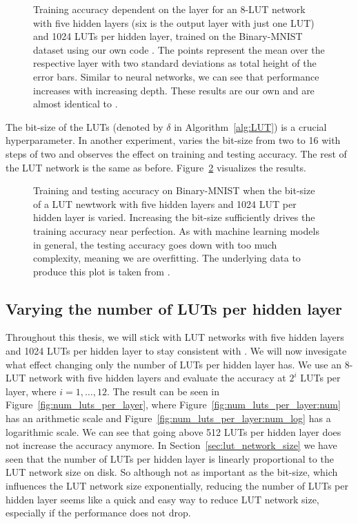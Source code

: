 \begin{figure}[!htb]
    \centering
    
    \caption{Training accuracy dependent on the layer for an 8-LUT network with five hidden layers (six is the output layer with just one LUT) and 1024 LUTs per hidden layer, trained on the Binary-MNIST dataset using our own code \cite{bib:lut_github}. The points represent the mean over the respective layer with two standard deviations as total height of the error bars. Similar to neural networks, we can see that performance increases with increasing depth. These results are our own and are almost identical to \cite{bib:chatterjee2018learning}.}
\label{fig:ex1_depth_performance}
\end{figure}
\FloatBarrier

\noindent The bit-size of the LUTs (denoted by $\delta$ in Algorithm~\ref{alg:LUT}) is a crucial hyperparameter. In another experiment, \cite{bib:chatterjee2018learning} varies the bit-size from two to 16 with steps of two and observes the effect on training and testing accuracy. The rest of the LUT network is the same as before. Figure~\ref{fig:ex1_k_acc} visualizes the results.

\begin{figure}[!htb]
    \centering
    
    \caption{Training and testing accuracy on Binary-MNIST when the bit-size of a LUT newtwork with five hidden layers and 1024 LUT per hidden layer is varied. Increasing the bit-size sufficiently drives the training accuracy near perfection. As with machine learning models in general, the testing accuracy goes down with too much complexity, meaning we are overfitting. The underlying data to produce this plot is taken from \cite{bib:chatterjee2018learning}.}
\label{fig:ex1_k_acc}
\end{figure}
\FloatBarrier

\subsection{Varying the number of LUTs per hidden layer} \label{sec:num_luts_per_layer}
Throughout this thesis, we will stick with LUT networks with five hidden layers and 1024 LUTs per hidden layer to stay consistent with \cite{bib:chatterjee2018learning}. We will now invesigate what effect changing only the number of LUTs per hidden layer has. We use an 8-LUT network with five hidden layers and evaluate the accuracy at $2^i$ LUTs per layer, where $i = 1, \dots, 12$. The result can be seen in Figure~\ref{fig:num_luts_per_layer}, where Figure~\ref{fig:num_luts_per_layer:num} has an arithmetic scale and Figure~\ref{fig:num_luts_per_layer:num_log} has a logarithmic scale. We can see that going above 512 LUTs per hidden layer does not increase the accuracy anymore. In Section~\ref{sec:lut_network_size} we have seen that the number of LUTs per hidden layer is linearly proportional to the LUT network size on disk. So although not as important as the bit-size, which influences the LUT network size exponentially, reducing the number of LUTs per hidden layer seems like a quick and easy way to reduce LUT network size, especially if the performance does not drop.

